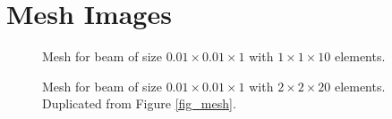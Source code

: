 \documentclass[a4paper, 12pt]{article}
\begin{document}
\newpage
\section{Mesh Images} \label{app_mesh_images}
\begin{figure}[H]
  \centering
  \caption{Mesh for beam of size $0.01 \times 0.01\times 1$ with $1\times 1\times 10$ elements.}
\end{figure}

\begin{figure}[H]
  \centering
  \caption{Mesh for beam of size $0.01 \times 0.01\times 1$ with $2\times 2\times 20$ elements.
           Duplicated from Figure \ref{fig_mesh}.}
\end{figure}
\end{document}
